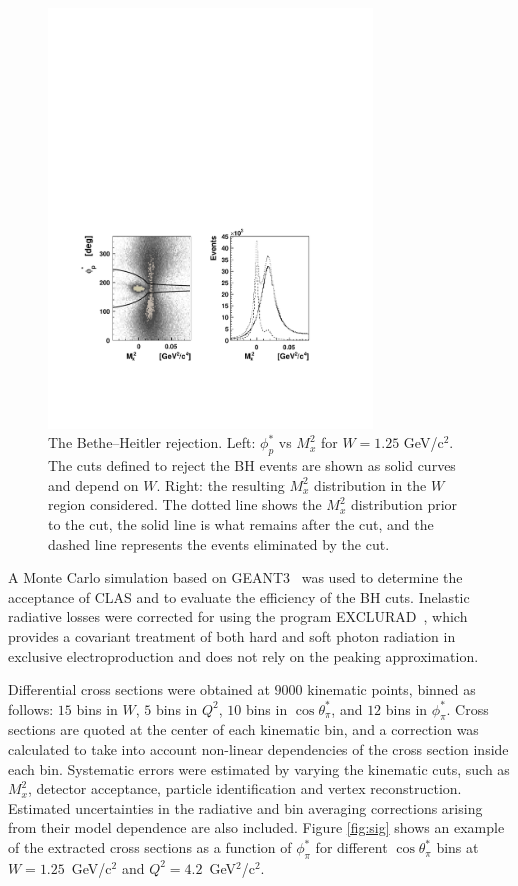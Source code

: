 \documentclass[aps,prl,twocolumn,superscriptaddress]{revtex4}
\begin{document}
\begin{figure}[t]
\includegraphics[width=8.6cm, bb=60 125 500 380]{img/mm_bethe_bw}
\caption{The Bethe--Heitler rejection. 
         Left:  $\phi^*_p$ vs $M_x^2$ for $W=1.25$ GeV/c$^2$.  The cuts 
         defined to reject the BH events are shown as solid curves and 
         depend on $W$. Right: the resulting $M_x^2$ distribution in the 
         $W$ region considered. The dotted line shows the $M_x^2$ 
         distribution prior to the cut, the solid line is what remains 
         after the cut, and the dashed line represents the events 
         eliminated by the cut.}
\label{fig:mm_bethe}
\end{figure} 

A Monte Carlo simulation based on GEANT3~\cite{bib:geant} was used to 
determine the acceptance of CLAS and to evaluate the efficiency 
of the BH cuts.  Inelastic radiative losses were corrected 
for using the program EXCLURAD~\cite{bib:radcorr}, which provides a covariant 
treatment of both hard and soft photon radiation in exclusive electroproduction 
and does not rely on the peaking approximation.  

Differential cross sections were obtained at $9000$ kinematic points, 
binned as follows: $15$ bins in $W$, $5$ bins in $Q^2$, $10$ bins in 
$\cos\theta^*_{\pi}$, and  $12$ bins in $\phi^*_{\pi}$.  Cross 
sections are quoted at the center of each kinematic bin, and a correction 
was calculated to take into account  non-linear dependencies of the cross 
section inside each bin.  Systematic errors were estimated by varying the 
kinematic cuts, such as  $M_x^2$, detector acceptance, particle identification
and vertex reconstruction. Estimated uncertainties in the radiative and bin 
averaging corrections arising from their model dependence are also included. 
Figure \ref{fig:sig} shows an example of the extracted cross sections as a 
function of $\phi^*_{\pi}$ for different $\cos\theta^*_{\pi}$ bins at 
$W= 1.25$~GeV/c$^2$ and $Q^2 = 4.2$~GeV$^2$/c$^2$.  
\end{document}
